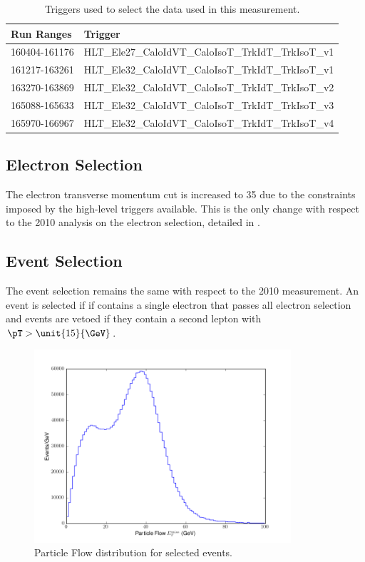\begin{table}[htbp]
  \begin{center}
    \leavevmode
     \begin{tabular}{ll} 
\toprule
      Run Ranges & Trigger  \\
     \midrule
     160404-161176 & HLT\_Ele27\_CaloIdVT\_CaloIsoT\_TrkIdT\_TrkIsoT\_v1  \\
     161217-163261 & HLT\_Ele32\_CaloIdVT\_CaloIsoT\_TrkIdT\_TrkIsoT\_v1  \\
     163270-163869 & HLT\_Ele32\_CaloIdVT\_CaloIsoT\_TrkIdT\_TrkIsoT\_v2  \\
     165088-165633 & HLT\_Ele32\_CaloIdVT\_CaloIsoT\_TrkIdT\_TrkIsoT\_v3  \\
     165970-166967 & HLT\_Ele32\_CaloIdVT\_CaloIsoT\_TrkIdT\_TrkIsoT\_v4  \\
\bottomrule
     \end{tabular}
  \caption{Triggers used to select the data used in this measurement.}
  \label{tab:updatedtriggers}
   \end{center}
\end{table}

\subsection{Electron Selection}

The electron transverse momentum cut is increased to \unit{35}{\GeV} due to the
constraints imposed by the high-level triggers available.  This is the only
change with respect to the 2010 analysis on the electron selection, detailed in
.

\subsection{Event Selection}
The event selection remains the same with respect to the 2010 measurement.
An event is selected if if contains a single electron that passes all electron
selection and events are vetoed if they contain a second lepton with
$\pT>\unit{15}{\GeV}$.


\begin{figure}[htbp]
  \centering
  \includegraphics*[width=0.85\textwidth]{pfmet_update}
  \caption{Particle Flow \ETm distribution for selected events.}
  \label{fig:pfmet}
\end{figure}

